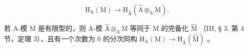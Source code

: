\[
\mathrm{H} _ {\mathrm{A}} (\mathrm{M}) \longrightarrow \mathrm{H} _ {\widehat {\mathrm{A}}} (\widehat {\mathrm{A}} \otimes_ {\mathrm{A}} \mathrm{M}).
\]

若 A-模 M 是有限型的，则 A-模 \(\widehat{\mathrm{A}}\otimes_{\mathrm{A}}\mathrm{M}\) 等同于 M 的完备化 \(\widehat{\mathrm{M}}\) （III, § 3, 第 4 节，定理 3），且有一个次数为 0 的分次同构 \(\mathrm{H}_{\mathrm{A}}(\mathrm{M})\to \mathrm{H}_{\widehat{\mathrm{A}}}(\widehat{\mathrm{M}})\) 。

